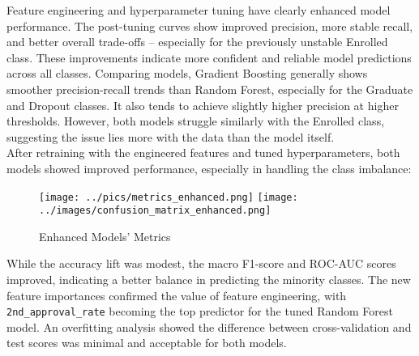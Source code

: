 \documentclass[twoside,final]{hcmut-report}
\begin{document}
Feature engineering and hyperparameter tuning have clearly enhanced model performance. The post-tuning curves show improved precision, more stable recall, and better overall trade-offs -- especially for the previously unstable Enrolled class. These improvements indicate more confident and reliable model predictions across all classes. Comparing models, Gradient Boosting generally shows smoother precision-recall trends than Random Forest, especially for the Graduate and Dropout classes. It also tends to achieve slightly higher precision at higher thresholds. However, both models struggle similarly with the Enrolled class, suggesting the issue lies more with the data than the model itself.\\

After retraining with the engineered features and tuned hyperparameters, both models showed improved performance, especially in handling the class imbalance:
\begin{figure}[H]
  \centering
  \texttt{[image: ../pics/metrics\_enhanced.png]}
  \texttt{[image: ../images/confusion\_matrix\_enhanced.png]}
  \caption{Enhanced Models' Metrics}
  \label{metrics_enhanced}
\end{figure}
While the accuracy lift was modest, the macro F1-score and ROC-AUC scores improved, indicating a better balance in predicting the minority classes. The new feature importances confirmed the value of feature engineering, with \texttt{2nd\_approval\_rate} becoming the top predictor for the tuned Random Forest model. An overfitting analysis showed the difference between cross-validation and test scores was minimal and acceptable for both models.
\end{document}
